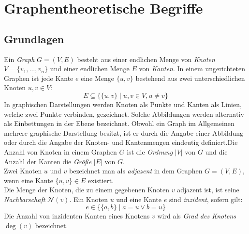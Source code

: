 \section{Graphentheoretische Begriffe}
\label{chap_prel}
\subsection{Grundlagen}
Ein \emph{Graph} $G = (V, E)$ besteht aus einer endlichen Menge von \emph{Knoten} $V = \{v_1 ,\ldots, v_n\}$ und einer endlichen Menge $E$ von \emph{Kanten}. In einem ungerichteten Graphen ist jede Kante $e$ eine Menge $\{u, v\}$ bestehend aus zwei unterschiedlichen Knoten $u, v \in V$:
$$E \subseteq \{\{u, v\}\; |\; u, v \in V, u \neq v\}$$
In graphischen Darstellungen werden Knoten als Punkte und Kanten als Linien, welche zwei Punkte verbinden, gezeichnet. Solche Abbildungen werden alternativ als Einbettungen in der Ebene bezeichnet. Obwohl ein Graph im Allgemeinen mehrere graphische Darstellung besitzt, ist er durch die Angabe einer Abbildung oder durch die Angabe der Knoten- und Kantenmengen eindeutig definiert.\newline \newline Die Anzahl von Knoten in einem Graphen $G$ ist die \emph{Ordnung} $|V|$ von $G$ und die Anzahl der Kanten die \emph{Größe} $|E|$ von $G$.\\Zwei Knoten $u$ und $v$ bezeichnet man als \emph{adjazent} in dem Graphen $G=(V,E)$, wenn eine Kante $\{u, v\} \in E$ existiert.\\Die Menge der Knoten, die zu einem gegebenen Knoten $v$ adjazent ist, ist seine \emph{Nachbarschaft} $\mathcal{N}(v)$. Ein Knoten $u$ und eine Kante $e$ sind \emph{inzident}, sofern gilt: $$e \in \{\{a,b\}\;|\;a=u \vee b=u\}$$ Die Anzahl von inzidenten Kanten eines Knotens $v$ wird als \emph{Grad des Knotens} $\deg(v)$ bezeichnet.\newline \newline
